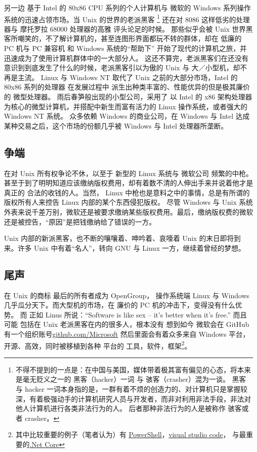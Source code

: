 \documentclass{ctexart}
\begin{document}
    另一边 基于 Intel 的 80x86 CPU 系列的个人计算机与 微软的 Windows 系列操作系统的迅速占领市场。当 Unix 的世界的老派黑客
    \footnote{不得不提到的一点是：在中国与美国，媒体带着极其富有偏见的心态，将本来是毫无贬义之一的 黑客（hacker）一词 与  骇客（crasher）混为一谈。
    黑客 与 hacker 一词本身指的是，一群有着不烦的创造力的、对计算机只是掌握较深，有着极强动手的计算机研究人员与开发者，而非对利用非法手段，非法对他人计算机进行各类非法行为的人。
    后者那种非法行为的人是被称作 骇客或者 crasher。}
    还在对 8086 这样低劣的处理器与 摩托罗拉 68000 处理器的高雅 评头论足的时候。
    那些似乎会被 Unix 世界黑客所嘲笑的，不了解计算机的，甚至连图形界面都玩不转的群体，却在 低廉的 PC 机与 PC 兼容机 和 Windows 系统的“帮助下”
    开始了现代的计算机之旅，并迅速成为了使用计算机群体中的一大部分人。
    这还不算完，老派黑客们在还没有意识到到底发生了什么的时候，老派黑客引以为傲的 Unix 与 大／小型机，却不再是主流。
    Linux 与 Windows NT 取代了 Unix 之前的大部分市场，Intel 的 80x86 系列的处理器 在发展过程中 派生出种类丰富的、性能优异的但是极其廉价的 微型处理器。
    雨后春笋般出现的小型公司，采用了 以 Intel 的 x86 架构处理器为核心的微型计算机，并搭配中新生而富有活力的 Linux 操作系统，或者强大的 Windows NT 系统。
    众多依赖 Windows 的商业公司，在 Windows 与 Intel 达成某种交易之后，这个市场的份额几乎被 Windows 与 Intel 处理器所垄断。

    \subsection{争端}
    在对 Unix 所有权争论不休，以至于 新型的 Linux 系统与 微软公司 频繁的中枪。甚至于到了明明知道应该缴纳版权费用，却有着数不清的人伸出手来并说着他才是真正的
    合法的收钱的人。当然， Linux 中枪也是意料之中的事情，总是有所谓的 版权所有人来控告 Linux 内部的某个东西侵犯版权。
    尽管 Windows 与 Unix 系统外表来说千差万别，微软还是被要求缴纳某些版权费用。最后，缴纳版权费的微软还是被控告，“原因”是把钱缴纳给了错误的一方。

    Unix 内部的新派黑客，也不断的嚷嚷着、呻吟着、哀嚎着 Unix 的末日即将到来。许多 Unix 中有着“名人”，转向 GNU 与 Linux 一方，继续着曾经的梦想。
    
    \subsection{尾声}
    在 Unix 的商标 最后的所有者成为 OpenGroup， 操作系统端 Linux 与 Windows 几乎瓜分天下。而大型机的市场，在 廉价的 PC 机的冲击下，变得没有什么优势。
    而 正如 Linus 所说：“Software is like sex -- it's better when it's free.” 而且可能 包括在 Unix 老派黑客在内的很多人，根本没有
    想到如今 微软会在 GitHub 有一个组织账号\href{https://github.com/microsoft}{github.com/Microsoft} 然后里面会有着众多来自 Windows
    平台，开源、高效，同时被移植到各种 平台的 工具，软件，框架\footnote{其中比较重要的例子（笔者认为）有
      \href{https://github.com/microsoft/powershell}{PowerShell}，\href{https://github.com/microsoft/vscode}{visual studio code}，
      与最重要的\href{https://github.com/microsoft/??}{.Net Core}}。
    
\end{document}
